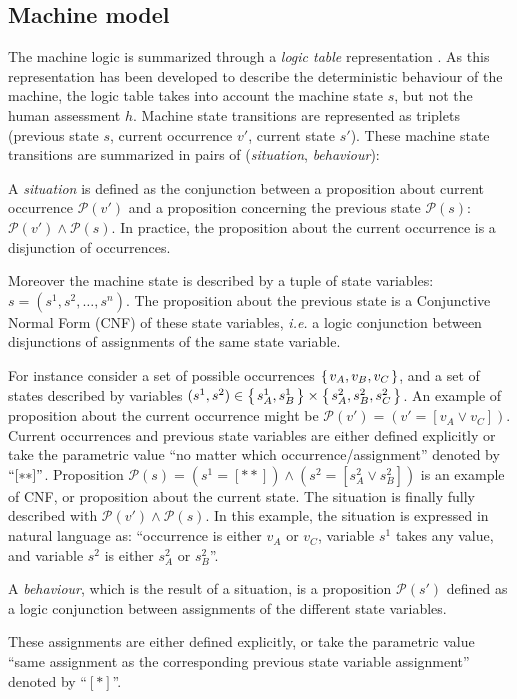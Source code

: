 \subsection{Machine model}
The machine logic is summarized through a \textit{logic table} 
representation \cite{feary05}. As this representation has been 
developed to describe the deterministic behaviour of the machine, 
the logic table takes into account the machine state $s$, 
but not the human assessment $h$. 
Machine state transitions are represented as triplets 
(previous state  $s$, current occurrence  $v'$, current state  $s'$).
These machine state transitions are summarized in pairs of 
(\textit{situation}, \textit{behaviour}):
\begin{Def}[Situation]
A \emph{situation} is defined as the conjunction between 
a proposition about current occurrence $\mathcal{P}(v')$ 
and a proposition concerning the previous state $\mathcal{P}(s)$: 
$\mathcal{P}(v') \land \mathcal{P}(s)$. 
In practice, the proposition about the current occurrence 
is a disjunction of occurrences.

Moreover the machine state is described 
by a tuple of state variables: $s=(s^1,s^2,\ldots,s^n)$. 
The proposition about the previous state 
is a Conjunctive Normal Form (CNF) of these state variables, 
\textit{i.e.} a logic conjunction 
between disjunctions of assignments 
of the same state variable.
\end{Def}
For instance consider a set of possible occurrences 
$\left\{ \left.  v_A, v_B, v_C  \right. \right\}$, and a set of states
described by variables $(s^1,s^2) \in \left\{ \left. s^1_A,s^1_B \right. \right\} \times \left\{ \left. s^2_A,s^2_B,s^2_C \right. \right\}$.
An example of proposition about the current occurrence might be 
$\mathcal{P}(v') = (v' = [v_{A} \lor v_{C}])$. Current occurrences 
and previous state variables are either defined explicitly 
or take the parametric value ``no matter which occurrence/assignment'' 
denoted by $``[**]"$.
Proposition $\mathcal{P}(s) = (s^{1} = [**]) \land (s^{2} = [s^2_A \lor s^2_B])$ 
is an example of CNF, or proposition about the current state. 
The situation is finally fully described with $\mathcal{P}(v') \land \mathcal{P}(s)$.
In this example, the situation is expressed in natural language as: 
``occurrence is either $v_{A}$ or $ v_{C}$, variable $s^{1}$ takes any value, 
and variable $s^{2}$ is either $s^2_A$ or $s^2_B$''. 

\begin{Def}[Behaviour]
A \emph{behaviour}, which is the result of a situation, 
is a proposition $\mathcal{P}(s')$ defined as a logic conjunction 
between assignments of the different state variables. 
\end{Def}
These assignments are either defined explicitly, 
or take the parametric value 
``same assignment as the corresponding previous state variable assignment'' 
denoted by ``$[*]$''.

